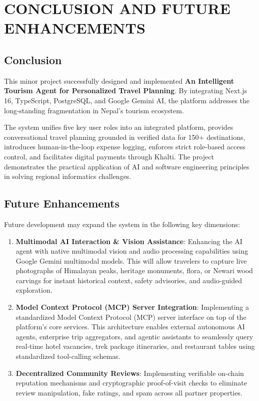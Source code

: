 \documentclass[12pt,a4paper]{report}
\begin{document}
\chapter{CONCLUSION AND FUTURE ENHANCEMENTS}

\section{Conclusion}
This minor project successfully designed and implemented \textbf{An Intelligent Tourism Agent for Personalized Travel Planning}. By integrating Next.js 16, TypeScript, PostgreSQL, and Google Gemini AI, the platform addresses the long-standing fragmentation in Nepal's tourism ecosystem. 

The system unifies five key user roles into an integrated platform, provides conversational travel planning grounded in verified data for 150+ destinations, introduces human-in-the-loop expense logging, enforces strict role-based access control, and facilitates digital payments through Khalti. The project demonstrates the practical application of AI and software engineering principles in solving regional informatics challenges.

\section{Future Enhancements}
Future development may expand the system in the following key dimensions:
\begin{enumerate}
    \item \textbf{Multimodal AI Interaction \& Vision Assistance}: Enhancing the AI agent with native multimodal vision and audio processing capabilities using Google Gemini multimodal models. This will allow travelers to capture live photographs of Himalayan peaks, heritage monuments, flora, or Newari wood carvings for instant historical context, safety advisories, and audio-guided exploration.
    \item \textbf{Model Context Protocol (MCP) Server Integration}: Implementing a standardized Model Context Protocol (MCP) server interface on top of the platform's core services. This architecture enables external autonomous AI agents, enterprise trip aggregators, and agentic assistants to seamlessly query real-time hotel vacancies, trek package itineraries, and restaurant tables using standardized tool-calling schemas.
    \item \textbf{Decentralized Community Reviews}: Implementing verifiable on-chain reputation mechanisms and cryptographic proof-of-visit checks to eliminate review manipulation, fake ratings, and spam across all partner properties.
\end{enumerate}
\end{document}
